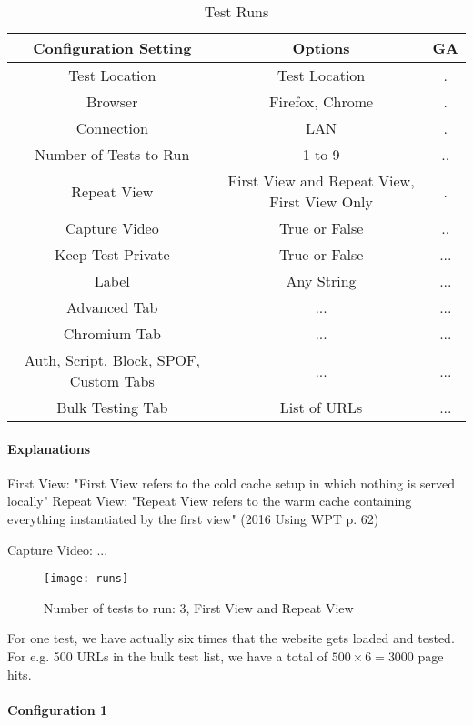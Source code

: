\begin{table}[h]
	\caption[Test Runs]{Test Runs \cite{DBLP:books/infix/Schwarz99}}
	\label{tab:tamodelleVergleich}
	\centering
	\begin{tabular}{ c | c | c } 
	Configuration Setting & Options & GA \\
	\hline \hline
	Test Location & Test Location & . \\ 
	Browser & Firefox, Chrome & . \\
	\hline
	Connection & LAN & . \\
	Number of Tests to Run & 1 to 9 & .. \\
	Repeat View & First View and Repeat View, First View Only & . \\
	Capture Video & True or False & .. \\
	Keep Test Private & True or False & ... \\
	Label & Any String & ... \\
	\hline	  
	Advanced Tab & ... & ... \\
	Chromium Tab & ... & ... \\
	Auth, Script, Block, SPOF, Custom Tabs & ... & ... \\
	Bulk Testing Tab & List of URLs & ... \\
	\end{tabular}
\end{table}

\paragraph{Explanations}

First View: "First View refers to the cold cache setup in which nothing is served locally"
Repeat View: "Repeat View refers to the warm cache containing everything instantiated by the first view"
(2016 Using WPT p. 62)

Capture Video: ...

\begin{figure}[h!]
  \caption{Number of tests to run: 3, First View and Repeat View}
  \texttt{[image: runs]}
\end{figure}

For one test, we have actually six times that the website gets loaded and tested.
For e.g. 500 URLs in the bulk test list, we have a total of $500 \times 6 = 3000$ page hits.


\paragraph{Configuration 1}

